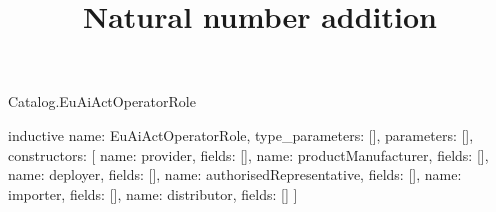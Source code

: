 \begin{lexlean}{Catalog.EuAiActOperatorRole}
\title{Natural number addition}
\begin{semanticmodule}
inductive{
  name: EuAiActOperatorRole,
  type_parameters: [],
  parameters: [],
  constructors: [
    {name: provider, fields: []},
    {name: productManufacturer, fields: []},
    {name: deployer, fields: []},
    {name: authorisedRepresentative, fields: []},
    {name: importer, fields: []},
    {name: distributor, fields: []}
  ]
}
\end{semanticmodule}
\end{lexlean}

